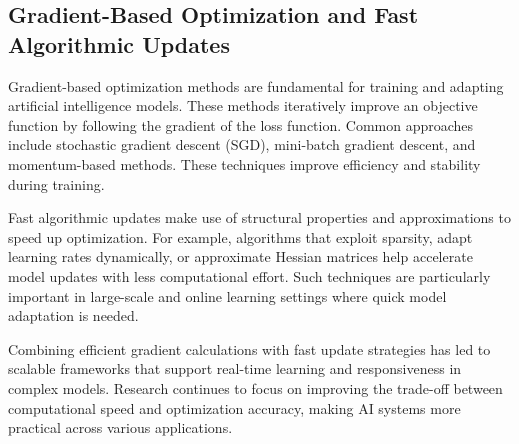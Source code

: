 \documentclass[sigconf]{acmart}
\begin{document}
\subsection{Gradient-Based Optimization and Fast Algorithmic Updates}

Gradient-based optimization methods are fundamental for training and adapting artificial intelligence models. These methods iteratively improve an objective function by following the gradient of the loss function. Common approaches include stochastic gradient descent (SGD), mini-batch gradient descent, and momentum-based methods. These techniques improve efficiency and stability during training.

Fast algorithmic updates make use of structural properties and approximations to speed up optimization. For example, algorithms that exploit sparsity, adapt learning rates dynamically, or approximate Hessian matrices help accelerate model updates with less computational effort. Such techniques are particularly important in large-scale and online learning settings where quick model adaptation is needed.

Combining efficient gradient calculations with fast update strategies has led to scalable frameworks that support real-time learning and responsiveness in complex models. Research continues to focus on improving the trade-off between computational speed and optimization accuracy, making AI systems more practical across various applications.
\end{document}
